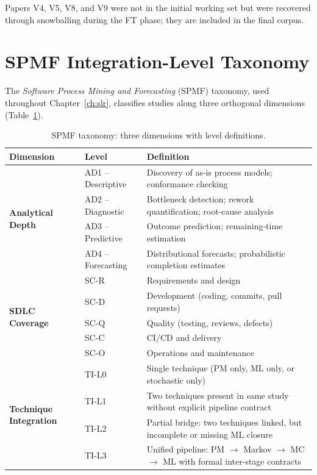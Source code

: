 Papers V4, V5, V8, and V9 were not in the initial working set but were
recovered through snowballing during the FT phase; they are included in
the final corpus.

\section{SPMF Integration-Level Taxonomy}
\label{app:slr-spmf}

The \textit{Software Process Mining and Forecasting} (SPMF) taxonomy, used
throughout Chapter~\ref{ch:slr}, classifies studies along three orthogonal
dimensions (Table~\ref{tab:app-spmf}).

\begin{table}[htbp]
\centering
\caption{SPMF taxonomy: three dimensions with level definitions.}
\label{tab:app-spmf}
\small
\setlength{\tabcolsep}{4pt}
\begin{tabular}{l l p{7.8cm}}
\toprule
\textbf{Dimension} & \textbf{Level} & \textbf{Definition} \\
\midrule
\multirow{4}{*}{\textbf{Analytical Depth}}
  & AD1 -- Descriptive  & Discovery of as-is process models; conformance checking \\
  & AD2 -- Diagnostic   & Bottleneck detection; rework quantification; root-cause analysis \\
  & AD3 -- Predictive   & Outcome prediction; remaining-time estimation \\
  & AD4 -- Forecasting  & Distributional forecasts; probabilistic completion estimates \\
\midrule
\multirow{5}{*}{\textbf{SDLC Coverage}}
  & SC-R & Requirements and design \\
  & SC-D & Development (coding, commits, pull requests) \\
  & SC-Q & Quality (testing, reviews, defects) \\
  & SC-C & CI/CD and delivery \\
  & SC-O & Operations and maintenance \\
\midrule
\multirow{4}{*}{\textbf{Technique Integration}}
  & TI-L0 & Single technique (PM only, ML only, or stochastic only) \\
  & TI-L1 & Two techniques present in same study without explicit pipeline contract \\
  & TI-L2 & Partial bridge: two techniques linked, but incomplete or missing ML closure \\
  & TI-L3 & Unified pipeline: PM $\rightarrow$ Markov $\rightarrow$ MC $\rightarrow$ ML
             with formal inter-stage contracts \\
\bottomrule
\end{tabular}
\end{table}

